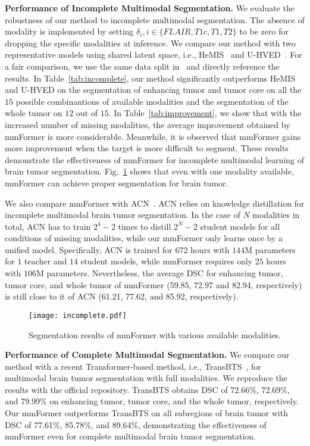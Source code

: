 \documentclass[runningheads]{llncs}
\begin{document}
\noindent\textbf{Performance of Incomplete Multimodal Segmentation.}
We evaluate the robustness of our method to incomplete multimodal segmentation. The absence of modality is implemented by setting $\delta_i, i\in \{FLAIR, T1c, T1, T2\}$ to be zero for dropping the specific modalities at inference.
We compare our method with two representative models using shared latent space, i.e., HeMIS~\cite{havaei2016hemis} and U-HVED~\cite{dorent2019hetero}.
For a fair comparison, we use the same data split in~\cite{wang2021acn} and directly reference the results. 
In Table~\ref{tab:incomplete}, our method significantly outperforms HeMIS and U-HVED on the segmentation of enhancing tumor and tumor core on all the $15$ possible combinantions of available modalities and the segmentation of the whole tumor on $12$ out of $15$. 
In Table~\ref{tab:improvement}, we show that with the increased number of missing modalities, the average improvement obtained by mmFormer is more considerable. Meanwhile, it is observed that mmFormer gains more improvement when the target is more difficult to segment. These results demonstrate the effectiveness of mmFormer for incomplete multimodal learning of brain tumor segmentation.
Fig.~\ref{fig:incomplete} shows that even with one modality available, mmFormer can achieve proper segmentation for brain tumor.

We also compare mmFormer with ACN~\cite{wang2021acn}. ACN relies on knowledge distillation for incomplete multimodal brain tumor segmentation. In the case of $N$ modalities in total, ACN has to train $2^4-2$ times to distill $2^N-2$ student models for all conditions of missing modalities, while our mmFormer only learns once by a unified model. Specifically, ACN is trained for $672$ hours with $144$M parameters for $1$ teacher and $14$ student models, while mmFormer requires only $25$ hours with $106$M parameters. Nevertheless, the average DSC for enhancing tumor, tumor core, and whole tumor of mmFormer (59.85, 72.97 and 82.94, respectively) is still close to it of ACN (61.21, 77.62, and 85.92, respectively). 

\begin{figure}[!tp]
\centering
\texttt{[image: incomplete.pdf]}	
\vspace{-6mm}
\caption{Segmentation results of mmFormer with various available modalities.}
\vspace{-4mm}
\label{fig:incomplete}
\end{figure}

\noindent\textbf{Performance of Complete Multimodal Segmentation.}
We compare our method with a recent Transformer-based method, i.e., TransBTS~\cite{wang2021transbts}, for multimodal brain tumor segmentation with full modalities. We reproduce the results with the official repository. TransBTS obtains DSC of 72.66\%, 72.69\%, and 79.99\% on enhancing tumor, tumor core, and the whole tumor, respectively. Our mmFormer outperforms TransBTS on all subregions of brain tumor with DSC of 77.61\%, 85.78\%, and 89.64\%, demonstrating the effectiveness of mmFormer even for complete multimodal brain tumor segmentation.
\end{document}
